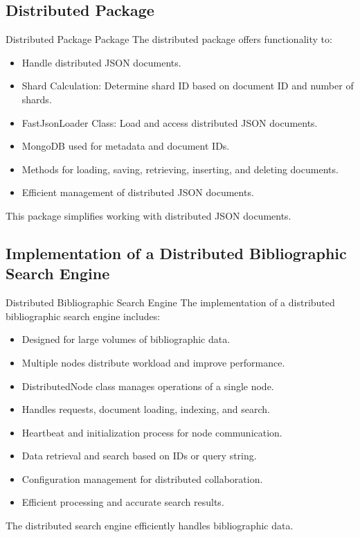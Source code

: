 \documentclass{beamer}
\begin{document}
\subsection{Distributed Package}

\begin{frame}{Distributed Package Package}
    The distributed package offers functionality to:
    \begin{itemize}
    \item Handle distributed JSON documents.
    \item Shard Calculation: Determine shard ID based on document ID and number of shards.
    \item FastJsonLoader Class: Load and access distributed JSON documents.
    \item MongoDB used for metadata and document IDs.
    \item Methods for loading, saving, retrieving, inserting, and deleting documents.
    \item Efficient management of distributed JSON documents.
    \end{itemize}
    This package simplifies working with distributed JSON documents.
    \end{frame}
    
\subsection{Implementation of a Distributed Bibliographic Search Engine}

\begin{frame}{Distributed Bibliographic Search Engine}
    The implementation of a distributed bibliographic search engine includes:
    \begin{itemize}
    \item Designed for large volumes of bibliographic data.
    \item Multiple nodes distribute workload and improve performance.
    \item DistributedNode class manages operations of a single node.
    \item Handles requests, document loading, indexing, and search.
    \item Heartbeat and initialization process for node communication.
    \item Data retrieval and search based on IDs or query string.
    \item Configuration management for distributed collaboration.
    \item Efficient processing and accurate search results.
    \end{itemize}
    The distributed search engine efficiently handles bibliographic data.
    \end{frame}
    
\end{document}
